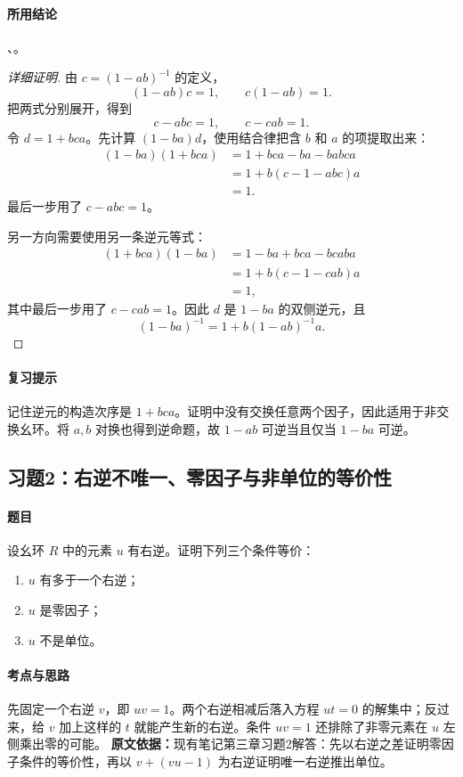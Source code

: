 \paragraph{所用结论}、。
\begin{proof}[详细证明]
由 $c=(1-ab)^{-1}$ 的定义，
\[
(1-ab)c=1,\qquad c(1-ab)=1.
\]
把两式分别展开，得到
\[
c-abc=1,\qquad c-cab=1.
\]
令 $d=1+bca$。先计算 $(1-ba)d$，使用结合律把含 $b$ 和 $a$ 的项提取出来：
\begin{align*}
(1-ba)(1+bca)
  &=1+bca-ba-babca\\
  &=1+b(c-1-abc)a\\
  &=1.
\end{align*}
最后一步用了 $c-abc=1$。

另一方向需要使用另一条逆元等式：
\begin{align*}
(1+bca)(1-ba)
  &=1-ba+bca-bcaba\\
  &=1+b(c-1-cab)a\\
  &=1,
\end{align*}
其中最后一步用了 $c-cab=1$。因此 $d$ 是 $1-ba$ 的双侧逆元，且
\[
\boxed{(1-ba)^{-1}=1+b(1-ab)^{-1}a.}
\]
\end{proof}

\paragraph{复习提示}
记住逆元的构造次序是 $1+bca$。证明中没有交换任意两个因子，因此适用于非交换幺环。将 $a,b$ 对换也得到逆命题，故 $1-ab$ 可逆当且仅当 $1-ba$ 可逆。

\subsection{习题2：右逆不唯一、零因子与非单位的等价性}\label{exercise:3:2}
\paragraph{题目}
设幺环 $R$ 中的元素 $u$ 有右逆。证明下列三个条件等价：
\begin{enumerate}
  \item $u$ 有多于一个右逆；
  \item $u$ 是零因子；
  \item $u$ 不是单位。
\end{enumerate}

\paragraph{考点与思路}
先固定一个右逆 $v$，即 $uv=1$。两个右逆相减后落入方程 $ut=0$ 的解集中；反过来，给 $v$ 加上这样的 $t$ 就能产生新的右逆。条件 $uv=1$ 还排除了非零元素在 $u$ 左侧乘出零的可能。
\textbf{原文依据：}现有笔记第三章习题2解答：先以右逆之差证明零因子条件的等价性，再以 $v+(vu-1)$ 为右逆证明唯一右逆推出单位。

